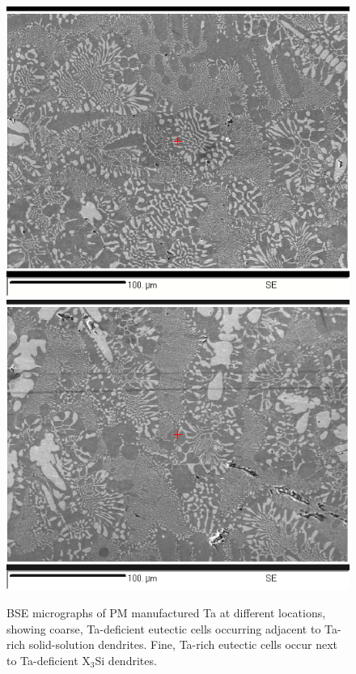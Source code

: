 %
%
\begin{figure}[htbp]
\begin{center}
\includegraphics[width=13cm]{sanTaii}
\includegraphics[width=13cm]{sanTaiii}
\caption{BSE micrographs of PM manufactured Ta at different locations, showing coarse, Ta-deficient eutectic cells occurring adjacent to Ta-rich solid-solution dendrites.  Fine, Ta-rich eutectic cells occur next to Ta-deficient X$_3$Si  dendrites.}\label{fig:sanTaii}
\end{center}
\end{figure}
